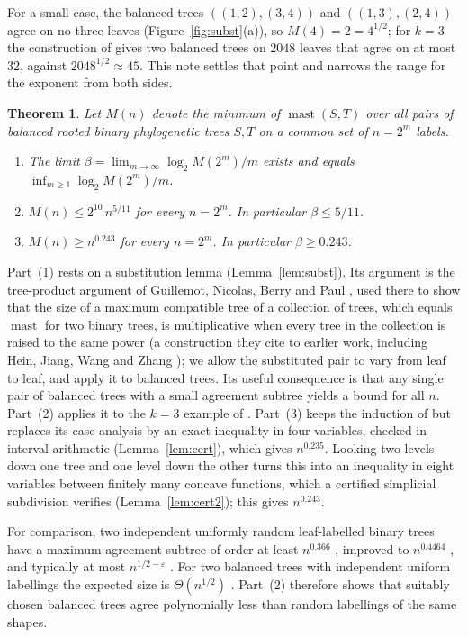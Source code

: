 \documentclass[11pt]{amsart}
\newtheorem{theorem}{Theorem}[section]
\theoremstyle{definition}
\newcommand{\mast}{\operatorname{mast}}
\begin{document}
For a small case, the balanced trees $((1,2),(3,4))$ and $((1,3),(2,4))$ agree on no three leaves
(Figure~\ref{fig:subst}(a)), so $M(4)=2=4^{1/2}$; for $k=3$ the construction of \cite{BLOSSW} gives
two balanced trees on $2048$ leaves that agree on at most $32$, against $2048^{1/2}\approx45$.
This note settles that point and narrows the range for the exponent from both sides.

\begin{theorem}\label{thm:main}
Let $M(n)$ denote the minimum of $\mast(S,T)$ over all pairs of balanced rooted binary
phylogenetic trees $S,T$ on a common set of $n=2^m$ labels.
\begin{enumerate}
\item The limit $\beta=\lim_{m\to\infty}\log_2 M(2^m)/m$ exists and equals
  $\inf_{m\ge1}\log_2 M(2^m)/m$.
\item $M(n)\le 2^{10}\,n^{5/11}$ for every $n=2^m$. In particular $\beta\le 5/11$.
\item $M(n)\ge n^{0.243}$ for every $n=2^m$. In particular $\beta\ge 0.243$.
\end{enumerate}
\end{theorem}

Part~(1) rests on a substitution lemma (Lemma~\ref{lem:subst}). Its argument is the tree-product
argument of Guillemot, Nicolas, Berry and Paul \cite[Section~5.3]{GNBP}, used there to show that the
size of a maximum compatible tree of a collection of trees, which equals $\mast$ for two binary trees,
is multiplicative when every tree in the collection is raised to the same power \cite[Lemma~40(ii)]{GNBP} (a construction they cite to earlier work, including Hein, Jiang, Wang and Zhang \cite{HJWZ}); we
allow the substituted pair to vary from leaf to leaf, and apply it to balanced trees. Its useful consequence is that any single pair of balanced trees
with a small agreement subtree yields a bound for all $n$. Part~(2) applies it to the $k=3$
example of \cite{BLOSSW}. Part~(3) keeps the induction of \cite[Theorem~1.3]{BLOSSW} but
replaces its case analysis by an exact inequality in four variables, checked in interval
arithmetic (Lemma~\ref{lem:cert}), which gives $n^{0.235}$. Looking two levels down one tree and one
level down the other turns this into an inequality in eight variables between finitely many concave
functions, which a certified simplicial subdivision verifies (Lemma~\ref{lem:cert2}); this gives
$n^{0.243}$.

For comparison, two independent uniformly random leaf-labelled binary trees have a maximum
agreement subtree of order at least $n^{0.366}$ \cite{Aldous}, improved to $n^{0.4464}$
\cite{Khezeli}, and typically at most $n^{1/2-\varepsilon}$ \cite{BS}. For two balanced trees
with independent uniform labellings the expected size is $\Theta(n^{1/2})$ \cite{MS}.
Part~(2) therefore shows that suitably chosen balanced trees agree polynomially less than
random labellings of the same shapes.
\end{document}
